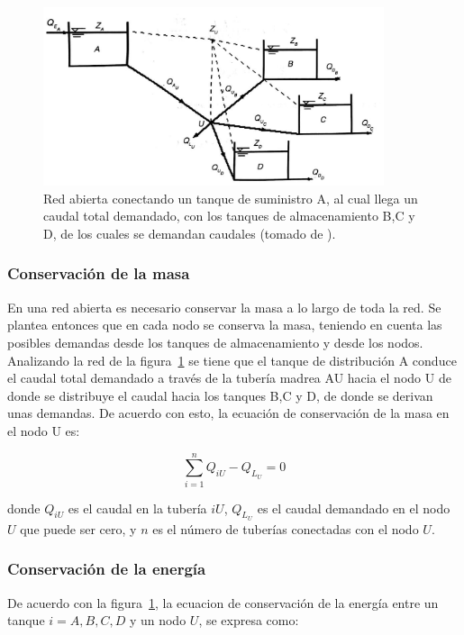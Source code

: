 \documentclass[11pt, oneside]{article}
\begin{document}
\begin{figure}[h]
\centering
\includegraphics[width=10cm]{./figs/opn2.jpeg}
\caption{Red abierta conectando un tanque de suministro A, al cual llega un caudal total demandado, con los tanques de almacenamiento B,C y D, de los cuales se demandan caudales (tomado de \cite{saldarriaga}).} 
\label{opn2}
\end{figure}


\subsubsection*{Conservaci\'on de la masa}
En una red abierta es necesario conservar la masa a lo largo de toda la red. Se plantea entonces que en cada nodo se conserva la masa, teniendo en cuenta las posibles demandas desde los tanques de almacenamiento y desde los nodos. Analizando la red de la figura~\ref{opn2} se tiene que el tanque de distribuci\'on A conduce el caudal total demandado a trav\'es de la tuber\'ia madrea AU hacia el nodo U de donde se distribuye el caudal hacia los tanques B,C y D, de donde se derivan unas demandas. De acuerdo con esto, la ecuaci\'on de conservaci\'on de la masa en el nodo U es:

\begin{equation}
\sum_{i=1}^{n} Q_{iU} - Q_{L_U} = 0
\label{opne1}
\end{equation}

donde $Q_{iU}$ es el caudal en la tuber\'ia $iU$, $Q_{L_U}$ es el caudal demandado en el nodo $U$ que puede ser cero, y $n$ es el n\'umero de tuber\'ias conectadas con el nodo $U$. 

\subsubsection*{Conservaci\'on de la energ\'ia}
De acuerdo con la figura~\ref{opn2}, la ecuacion de conservaci\'on de la energ\'ia entre un tanque $i = A,B,C,D$ y un nodo $U$, se expresa como:
\end{document}
